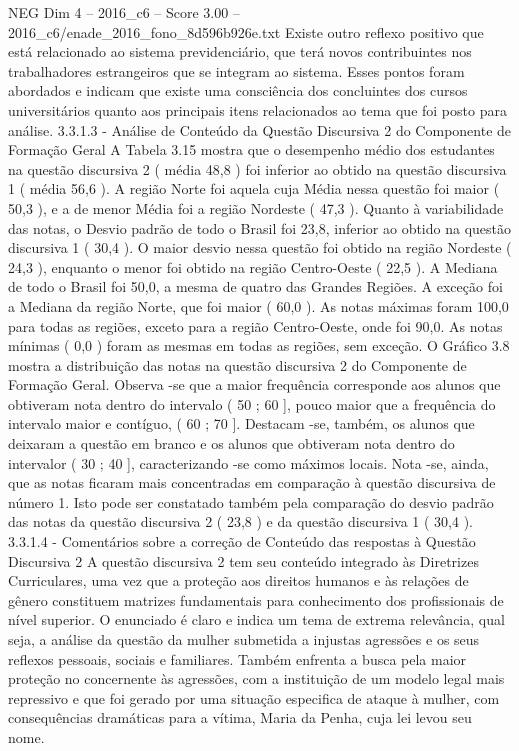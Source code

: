 \begin{textsample}{NEG Dim 4 – 2016\_c6 – Score 3.00 – 2016\_c6/enade\_2016\_fono\_8d596b926e.txt}
Existe outro reflexo positivo que está relacionado ao sistema previdenciário, que terá novos contribuintes nos trabalhadores estrangeiros que se integram ao sistema.
Esses pontos foram abordados e indicam que existe uma consciência dos concluintes dos cursos universitários quanto aos principais itens relacionados ao tema que foi posto para análise. 3.3.1.3 - Análise de Conteúdo da Questão Discursiva 2 do Componente de Formação Geral A Tabela 3.15 mostra que o desempenho médio dos estudantes na questão discursiva 2 ( média 48,8 ) foi inferior ao obtido na questão discursiva 1 ( média 56,6 ).
A região Norte foi aquela cuja Média nessa questão foi maior ( 50,3 ), e a de menor Média foi a região Nordeste ( 47,3 ).
Quanto à variabilidade das notas, o Desvio padrão de todo o Brasil foi 23,8, inferior ao obtido na questão discursiva 1 ( 30,4 ).
O maior desvio nessa questão foi obtido na região Nordeste ( 24,3 ), enquanto o menor foi obtido na região Centro-Oeste ( 22,5 ).
A Mediana de todo o Brasil foi 50,0, a mesma de quatro das Grandes Regiões.
A exceção foi a Mediana da região Norte, que foi maior ( 60,0 ).
As notas máximas foram 100,0 para todas as regiões, exceto para a região Centro-Oeste, onde foi 90,0.
As notas mínimas ( 0,0 ) foram as mesmas em todas as regiões, sem exceção.
O Gráfico 3.8 mostra a distribuição das notas na questão discursiva 2 do Componente de Formação Geral.
Observa -se que a maior frequência corresponde aos alunos que obtiveram nota dentro do intervalo ( 50 ; 60 ], pouco maior que a frequência do intervalo maior e contíguo, ( 60 ; 70 ].
Destacam -se, também, os alunos que deixaram a questão em branco e os alunos que obtiveram nota dentro do intervalor ( 30 ; 40 ], caracterizando -se como máximos locais.
Nota -se, ainda, que as notas ficaram mais concentradas em comparação à questão discursiva de número 1.
Isto pode ser constatado também pela comparação do desvio padrão das notas da questão discursiva 2 ( 23,8 ) e da questão discursiva 1 ( 30,4 ). 3.3.1.4 - Comentários sobre a correção de Conteúdo das respostas à Questão Discursiva 2 A questão discursiva 2 tem seu conteúdo integrado às Diretrizes Curriculares, uma vez que a proteção aos direitos humanos e às relações de gênero constituem matrizes fundamentais para conhecimento dos profissionais de nível superior.
O enunciado é claro e indica um tema de extrema relevância, qual seja, a análise da questão da mulher submetida a injustas agressões e os seus reflexos pessoais, sociais e familiares.
Também enfrenta a busca pela maior proteção no concernente às agressões, com a instituição de um modelo legal mais repressivo e que foi gerado por uma situação especifica de ataque à mulher, com consequências dramáticas para a vítima, Maria da Penha, cuja lei levou seu nome.

\end{textsample}
